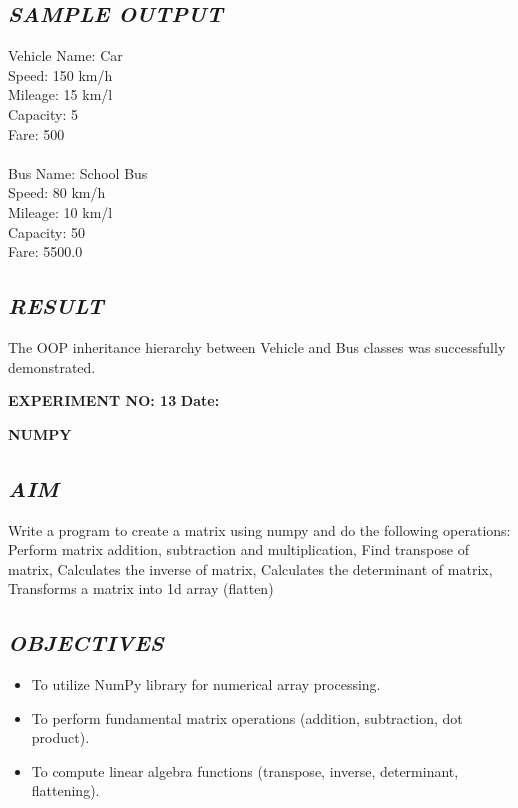 \documentclass[11pt,a4paper]{article}
\begin{document}
\subsection*{\textit{SAMPLE OUTPUT}}
\begin{tcolorbox}[colback=black!85,colframe=navyblue,title=\textbf{Terminal Output},coltitle=white,fonttitle=\bfseries\small]
\small\ttfamily\color{green!30!white}
Vehicle Name: Car\\
Speed: 150 km/h\\
Mileage: 15 km/l\\
Capacity: 5\\
Fare: 500\\
\\
Bus Name: School Bus\\
Speed: 80 km/h\\
Mileage: 10 km/l\\
Capacity: 50\\
Fare: 5500.0
\end{tcolorbox}

\subsection*{\textit{RESULT}}
The OOP inheritance hierarchy between Vehicle and Bus classes was successfully demonstrated.

\newpage

\noindent
\textbf{\large EXPERIMENT NO: 13} \hfill \textbf{\large Date: \underline{\hspace{3cm}}}

\vspace{0.2cm}
\begin{center}
{\Huge \textbf{\textcolor{navyblue}{NUMPY}}}
\end{center}
\vspace{0.3cm}

\subsection*{\textit{AIM}}
Write a program to create a matrix using numpy and do the following operations: Perform matrix addition, subtraction and multiplication, Find transpose of matrix, Calculates the inverse of matrix, Calculates the determinant of matrix, Transforms a matrix into 1d array (flatten)

\subsection*{\textit{OBJECTIVES}}
\begin{itemize}
  \item To utilize NumPy library for numerical array processing.
  \item To perform fundamental matrix operations (addition, subtraction, dot product).
  \item To compute linear algebra functions (transpose, inverse, determinant, flattening).
\end{itemize}
\end{document}
